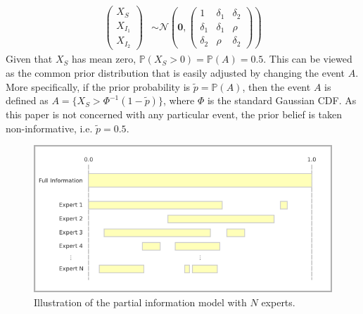 \documentclass[11pt]{article}
\renewcommand{\P}{\mathbb{P}}
\theoremstyle{definition}
\theoremstyle{definition}
\begin{document}
\begin{align}
\left(\begin{matrix} X_S \\ X_{I_1}\\ X_{I_2} \end{matrix}\right) &\sim \mathcal{N}\left(
 \boldsymbol{0},  \left(\begin{matrix} 
1 & \delta_1 & \delta_2\\
\delta_1 & \delta_1 &\rho\\
\delta_2 & \rho & \delta_2
 \end{matrix}\right)\right) \label{twoExperts}
\end{align}
Given that $X_S$ has mean zero, $\P(X_S > 0) = \P(A) = 0.5$. This can be viewed as the common prior distribution that is easily adjusted by changing the event $A$. More specifically, if the prior probability is $\tilde{p} = \P(A)$, then the event $A$ is defined as $A = \{ X_S > \Phi^{-1}(1-\tilde{p}) \}$, where $\Phi$ is the standard Gaussian CDF. As this paper is not concerned with any particular event, the prior belief is taken non-informative, i.e. $\tilde{p} = 0.5$.  

\begin{figure}[htbp]
   \includegraphics[width = \textwidth]{N=N} %
   \caption{Illustration of the partial information model with $N$ experts.}
   \label{diagramN}
\end{figure}
\end{document}
